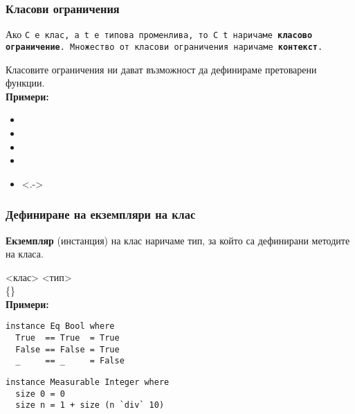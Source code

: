 \documentclass[alsotrans]{beamerswitch}
\begin{document}
\begin{frame}
  \frametitle{Класови ограничения}
  \begin{definition}
    Ако \tt{C} e клас, а \tt{t} е типова променлива, то \tt{C t} наричаме \textbf{класово ограничение}. \pause Множество от класови ограничения наричаме \textbf{контекст}.
  \end{definition}
  \pause
  Класовите ограничения ни дават възможност да дефинираме претоварени функции.\\[1em]
  \pause
  \textbf{Примери:}
  \begin{itemize}[<+->]
  \item {}
  \item {}
  \item {}
  \item {}
  \item<.-> 
  \end{itemize}
\end{frame}

\begin{frame}[fragile]
  \frametitle{Дефиниране на екземпляри на клас}
  \begin{definition}
    \textbf{Екземпляр} (инстанция) на клас наричаме тип, за който са дефинирани методите на класа.
  \end{definition}
  \pause
   <клас> <тип> \\
  \hspace{2ex} \{<дефиниция-на-метод>\}\\[1em]
  \pause
  \textbf{Примери:}
\begin{lstlisting}
instance Eq Bool where
  True  == True  = True
  False == False = True
  _     == _     = False
\end{lstlisting}
  \pause
\begin{lstlisting}
instance Measurable Integer where
  size 0 = 0
  size n = 1 + size (n `div` 10)
\end{lstlisting}
\end{frame}
\end{document}
